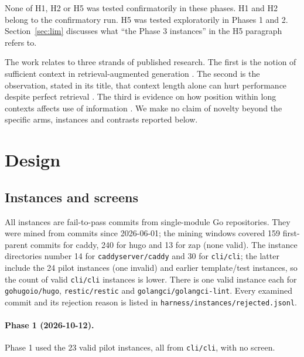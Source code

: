 None of H1, H2 or H5 was tested confirmatorily in these phases. H1 and H2 belong to the confirmatory run. H5 was tested exploratorily in Phases 1 and 2. Section~\ref{sec:lim} discusses what ``the Phase 3 instances'' in the H5 paragraph refers to.

The work relates to three strands of published research. The first is the notion of sufficient context in retrieval-augmented generation \cite{joren2025}. The second is the observation, stated in its title, that context length alone can hurt performance despite perfect retrieval \cite{du2025}. The third is evidence on how position within long contexts affects use of information \cite{liu2024}. We make no claim of novelty beyond the specific arms, instances and contrasts reported below.

\section{Design}

\subsection{Instances and screens}

All instances are fail-to-pass commits from single-module Go repositories. They were mined from commits since 2026-06-01; the mining windows covered 159 first-parent commits for caddy, 240 for hugo and 13 for zap (none valid). The instance directories number 14 for \texttt{caddyserver/caddy} and 30 for \texttt{cli/cli}; the latter include the 24 pilot instances (one invalid) and earlier template/test instances, so the count of valid \texttt{cli/cli} instances is lower. There is one valid instance each for \texttt{gohugoio/hugo}, \texttt{restic/restic} and \texttt{golangci/golangci-lint}. Every examined commit and its rejection reason is listed in \texttt{harness/instances/rejected.jsonl}.

\paragraph{Phase 1 (2026-10-12).} Phase 1 used the 23 valid pilot instances, all from \texttt{cli/cli}, with no screen.

